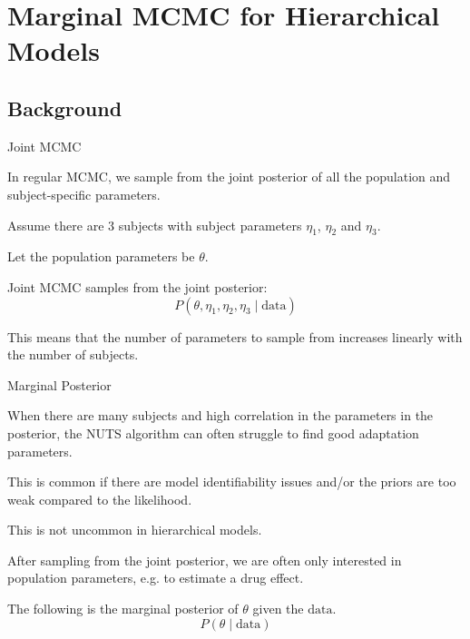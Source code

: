 
\section{Marginal MCMC for Hierarchical Models}

\subsection{Background}
\begin{frame}{Joint MCMC}
	\begin{vfilleditems}
		\item In regular MCMC, we sample from the joint posterior of all the population and subject-specific parameters.
		\item Assume there are 3 subjects with subject parameters $\eta_1$, $\eta_2$ and $\eta_3$.
		\item Let the population parameters be $\theta$.
		\item Joint MCMC samples from the joint posterior:
		$$
			P(\theta, \eta_1, \eta_2, \eta_3 \mid \text{data})
		$$
		\item This means that the number of parameters to sample from increases linearly with the number of subjects.
	\end{vfilleditems}
\end{frame}

\begin{frame}{Marginal Posterior}
	\begin{vfilleditems}
		\item When there are many subjects and high correlation in the parameters in the posterior, the NUTS algorithm can often struggle to find good adaptation parameters.
		\item This is common if there are model identifiability issues and/or the priors are too weak compared to the likelihood.
		\item This is not uncommon in hierarchical models.
		\item After sampling from the joint posterior, we are often only interested in population parameters, e.g. to estimate a drug effect.
		\item The following is the marginal posterior of $\theta$ given the $\text{data}$.
		$$
			P(\theta \mid \text{data})
		$$
	\end{vfilleditems}
\end{frame}

